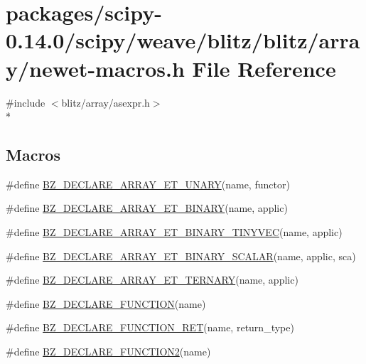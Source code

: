 \hypertarget{newet-macros_8h}{}\section{packages/scipy-\/0.14.0/scipy/weave/blitz/blitz/array/newet-\/macros.h File Reference}
\label{newet-macros_8h}
{\ttfamily \#include $<$blitz/array/asexpr.\+h$>$}\\*
\subsection*{Macros}
\begin{DoxyCompactItemize}
\item 
\#define \hyperlink{newet-macros_8h_a91ac8e17556917b783a0d9fbdbe23cf0}{B\+Z\+\_\+\+D\+E\+C\+L\+A\+R\+E\+\_\+\+A\+R\+R\+A\+Y\+\_\+\+E\+T\+\_\+\+U\+N\+A\+R\+Y}(name,  functor)
\item 
\#define \hyperlink{newet-macros_8h_a12923c144c4f726564115a6c8f8beb08}{B\+Z\+\_\+\+D\+E\+C\+L\+A\+R\+E\+\_\+\+A\+R\+R\+A\+Y\+\_\+\+E\+T\+\_\+\+B\+I\+N\+A\+R\+Y}(name,  applic)
\item 
\#define \hyperlink{newet-macros_8h_a93ef00f7668c012c31eef02ba3450668}{B\+Z\+\_\+\+D\+E\+C\+L\+A\+R\+E\+\_\+\+A\+R\+R\+A\+Y\+\_\+\+E\+T\+\_\+\+B\+I\+N\+A\+R\+Y\+\_\+\+T\+I\+N\+Y\+V\+E\+C}(name,  applic)
\item 
\#define \hyperlink{newet-macros_8h_a94fa9d7e168361532eb54e594ad7952b}{B\+Z\+\_\+\+D\+E\+C\+L\+A\+R\+E\+\_\+\+A\+R\+R\+A\+Y\+\_\+\+E\+T\+\_\+\+B\+I\+N\+A\+R\+Y\+\_\+\+S\+C\+A\+L\+A\+R}(name,  applic,  sca)
\item 
\#define \hyperlink{newet-macros_8h_aa38989947845f49c21a488e2f5267ed5}{B\+Z\+\_\+\+D\+E\+C\+L\+A\+R\+E\+\_\+\+A\+R\+R\+A\+Y\+\_\+\+E\+T\+\_\+\+T\+E\+R\+N\+A\+R\+Y}(name,  applic)
\item 
\#define \hyperlink{newet-macros_8h_a3fe1124fdf090ff4c26a68ce7927b143}{B\+Z\+\_\+\+D\+E\+C\+L\+A\+R\+E\+\_\+\+F\+U\+N\+C\+T\+I\+O\+N}(name)
\item 
\#define \hyperlink{newet-macros_8h_a375239fd7c0271583d8c690977908b74}{B\+Z\+\_\+\+D\+E\+C\+L\+A\+R\+E\+\_\+\+F\+U\+N\+C\+T\+I\+O\+N\+\_\+\+R\+E\+T}(name,  return\+\_\+type)
\item 
\#define \hyperlink{newet-macros_8h_ad2bec05831658ebff76259cd33bef73c}{B\+Z\+\_\+\+D\+E\+C\+L\+A\+R\+E\+\_\+\+F\+U\+N\+C\+T\+I\+O\+N2}(name)
\item 

\end{DoxyCompactItemize}
